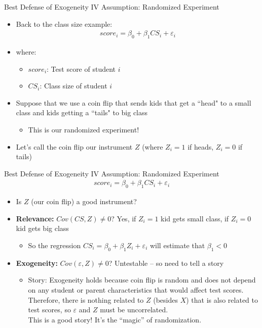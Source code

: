 \documentclass[aspectratio=169,11pt]{beamer}
\begin{document}
\begin{frame}{Best Defense of Exogeneity IV Assumption: Randomized Experiment}
\begin{itemize}
\item Back to the class size example:
\begin{align*}
score_i = \beta_0 + \beta_1 \textit{CS}_i + \varepsilon_i
\end{align*}
\item where:
\begin{itemize}
\item $score_i$: Test score of student $i$
\item $CS_i$: Class size of student $i$
\end{itemize}
\medskip
\item Suppose that we use a coin flip that sends kids that get a ``head" to a small class and kids getting a ``tails" to big class
\begin{itemize}
\item This is our randomized experiment!
\end{itemize}
\medskip
\item Let's call the coin flip our instrument $Z$ (where $Z_i=1$ if heads, $Z_i=0$ if tails)
\end{itemize}
\end{frame}

\begin{frame}{Best Defense of Exogeneity IV Assumption: Randomized Experiment}
\vspace{-0.5em}
\begin{align*}
score_i = \beta_0 + \beta_1 \textit{CS}_i + \varepsilon_i
\end{align*}
\begin{itemize}
\item Is $Z$ (our coin flip) a good instrument?
\medskip
\item {\bf Relevance:} $Cov(CS,Z)\ne 0$? Yes, if $Z_i=1$ kid gets small class, if $Z_i=0$ kid gets big class
\begin{itemize}
\item So the regression $CS_i=\beta_0 + \beta_1 Z_i + \varepsilon_i$ will estimate that $\beta_1<0$
\end{itemize}
\medskip
\item {\bf Exogeneity:} $Cov(\varepsilon,Z)\ne 0$? Untestable -- so need to tell a story
\begin{itemize}
\item Story: Exogeneity holds because coin flip is random and does not depend on any student or parent characteristics that would affect test scores.  Therefore, there is nothing related to $Z$ (besides $X$) that is also related to test scores, so $\varepsilon$ and $Z$ must be uncorrelated.\\
This is a good story! It's the ``magic'' of randomization.
\end{itemize}
\end{itemize}
\end{frame}
\end{document}
